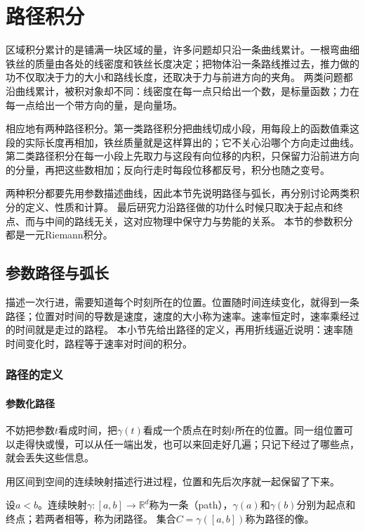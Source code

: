 \par{}
\section{路径积分}
\label{sec:multivariable-path-integration}

区域积分累计的是铺满一块区域的量，许多问题却只沿一条曲线累计。一根弯曲细铁丝的质量由各处的线密度和铁丝长度决定；把物体沿一条路线推过去，推力做的功不仅取决于力的大小和路线长度，还取决于力与前进方向的夹角。
两类问题都沿曲线累计，被积对象却不同：线密度在每一点只给出一个数，是标量函数；力在每一点给出一个带方向的量，是向量场。

相应地有两种路径积分。第一类路径积分把曲线切成小段，用每段上的函数值乘这段的实际长度再相加，铁丝质量就是这样算出的；它不关心沿哪个方向走过曲线。
第二类路径积分在每一小段上先取力与这段有向位移的内积，只保留力沿前进方向的分量，再把这些数相加；反向行走时每段位移都反号，积分也随之变号。

两种积分都要先用参数描述曲线，因此本节先说明路径与弧长，再分别讨论两类积分的定义、性质和计算。
最后研究力沿路径做的功什么时候只取决于起点和终点、而与中间的路线无关，这对应物理中保守力与势能的关系。
本节的参数积分都是一元Riemann积分。

\subsection{参数路径与弧长}
\label{sec:multivariable-line-integrals}

描述一次行进，需要知道每个时刻所在的位置。位置随时间连续变化，就得到一条路径；位置对时间的导数是速度，速度的大小称为速率。速率恒定时，速率乘经过的时间就是走过的路程。
本小节先给出路径的定义，再用折线逼近说明：速率随时间变化时，路程等于速率对时间的积分。

\subsubsection{路径的定义}

\paragraph{参数化路径}

不妨把参数$t$看成时间，把$\gamma(t)$看成一个质点在时刻$t$所在的位置。同一组位置可以走得快或慢，可以从任一端出发，也可以来回走好几遍；只记下经过了哪些点，就会丢失这些信息。

用区间到空间的连续映射描述行进过程，位置和先后次序就一起保留了下来。
\begin{definition}[路径]
设$a<b$。连续映射$\gamma:[a,b]\to\mathbb R^d$称为一条（path），$\gamma(a)$和$\gamma(b)$分别为起点和终点；若两者相等，称为闭路径。
集合$C=\gamma([a,b])$称为路径的像。
\end{definition}

